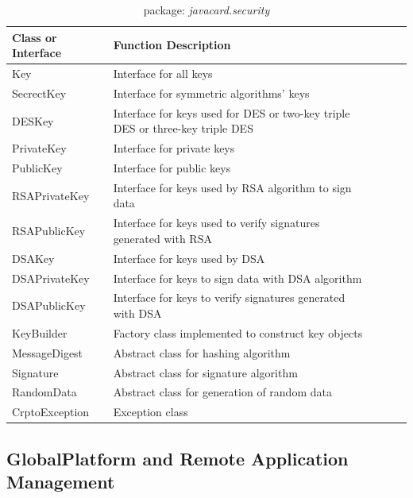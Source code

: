 \documentclass[]{llncs}
\begin{document}
\begin{table}[ht]
\caption{package: \emph{javacard.security}}
\centering
\begin{tabular}{lllll}
\hline
 Class or Interface & Function Description\\
\hline\hline
 Key &Interface for all keys   \\
 SecrectKey &Interface for symmetric algorithms' keys\\
DESKey & Interface for keys used for DES or two-key triple DES or three-key triple DES\\
PrivateKey &Interface for private keys\\
PublicKey & Interface for public keys\\
RSAPrivateKey& Interface for keys used by RSA algorithm to sign data\\
RSAPublicKey & Interface for keys used to verify signatures generated with RSA \\
DSAKey& Interface for keys used by DSA\\ 
DSAPrivateKey& Interface for keys to sign data with DSA algorithm\\
DSAPublicKey& Interface for keys to verify signatures generated with DSA\\
KeyBuilder& Factory class implemented to construct key objects\\
MessageDigest& Abstract class for hashing algorithm\\
Signature& Abstract class for signature algorithm\\
RandomData&Abstract class for generation of random data \\
CrptoException& Exception class\\
\hline
\end{tabular}
\label{table:javacard-security}
\end{table}


\subsection{GlobalPlatform and Remote Application Management}
\end{document}
